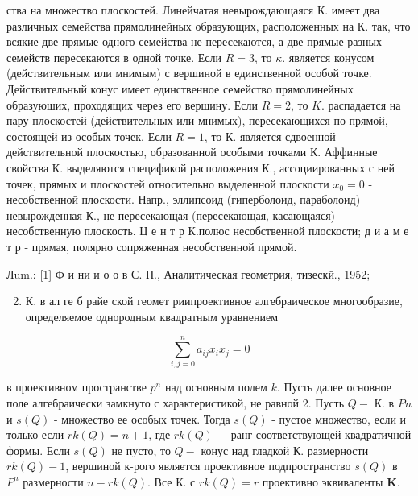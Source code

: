 \documentclass[10pt]{article}
\begin{document}
ства на множество плоскостей. Линейчатая невырождающаяся К. имеет два различных семейства прямолинейных образующих, расположенных на К. так, что всякие две прямые одного семейства не пересекаются, а две прямые разных семейств пересекаются в одной точке. Если $R=3$, то $\kappa$. является конусом (действительным или мнимым) с вершиной в единственной особой точке. Действительный конус имеет единственное семейство прямолинейных образуюших, проходящих через его вершину. Если $R=2$, то $K$. распадается на пару плоскостей (действительных или мнимых), пересекающихся по прямой, состоящей из особых точек. Если $R=1$, то К. является сдвоенной действительной плоскостью, образованной особыми точками К. Аффинные свойства К. выделяются спецификой расположения К., ассоциированных с ней точек, прямых и плоскостей относительно выделенной плоскости $x_{0}=0$ - несобственной плоскости. Напр., эллипсоид (гиперболоид, параболоид) невырожденная К., не пересекающая (пересекающая, касающаяся) несобственную плоскость. Ц е н т р К.полюс несобственной плоскости; д и а м е т р - прямая, полярно сопряженная несобственной прямой.



Лum.: [1] Ф и ни и о о в С. П., Аналитическая геометрия, тизескй., 1952;



\begin{enumerate}

  \setcounter{enumi}{1}

  \item К. в ал ге б райе ской геомет риипроективное алгебраическое многообразие, определяемое однородным квадратным уравнением

\end{enumerate}



\[

\sum_{i, j=0}^{n} a_{i j} x_{i} x_{j}=0

\]



в проективном пространстве $p^{n}$ над основным полем $k$. Пусть далее основное поле алгебраически замкнуто с характеристикой, не равной 2. Пусть $Q-$ К. в $P n$ и $s(Q)$ - множество ее особых точек. Тогда $s(Q)$ - пустое множество, если и только если $r k(Q)=n+1$, где $r k(Q)-$ ранг соответствующей квадратичной формы. Если $s(Q)$ не пусто, то $Q-$ конус над гладкой $К$. размерности $r k(Q)-1$, вершиной к-рого является проективное подпространство $s(Q)$ в $P^{n}$ размерности $n-r k(Q)$. Все К. с $r k(Q)=r$ проективно эквиваленты $\mathbf{K}$.
\end{document}
